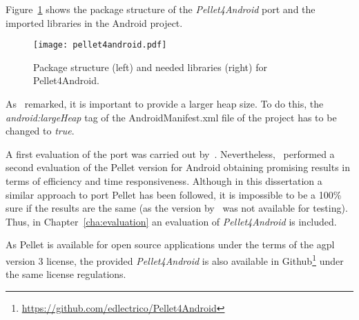 Figure~\ref{fig:pellet4android} shows the package structure of the
\textit{Pellet4Android} port and the imported libraries in the Android project.
% 

\begin{figure}[H]
\centering
\texttt{[image: pellet4android.pdf]}
\caption{Package structure (left) and needed libraries (right) for Pellet4Android.}
\label{fig:pellet4android}
\end{figure}


As~\citet{yus_android_2013} remarked, it is important to provide a larger heap
size. To do this, the \textit{android:largeHeap} tag of the AndroidManifest.xml 
file of the project has to be changed to \textit{true}.

A first evaluation of the port was carried out by~\citet{yus_android_2013}.
Nevertheless,~\citet{bobed_android_2014} performed a second evaluation of the
Pellet version for Android obtaining promising results in terms of efficiency
and time responsiveness. Although in this dissertation a similar approach to port 
Pellet has been followed, it is impossible to be a 100\% sure if the results are 
the same (as the version by~\citet{yus_android_2013} was not available for testing). 
Thus, in Chapter~\ref{cha:evaluation} an evaluation of \textit{Pellet4Android} is 
included.

As Pellet is available for open source applications under the terms of the \ac{agpl}
version 3 license, the provided \textit{Pellet4Android} is also available in
Github\footnote{\url{https://github.com/edlectrico/Pellet4Android}} under the same license regulations.